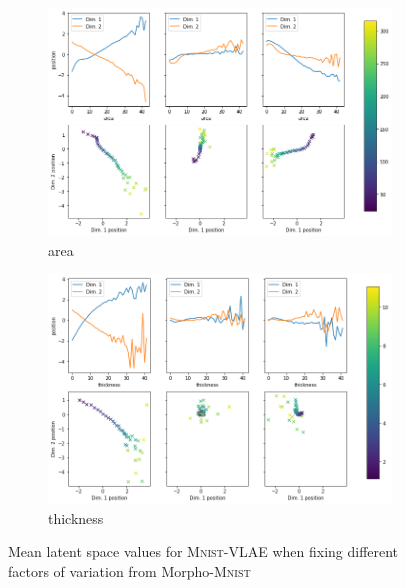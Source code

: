 \documentclass{beamer}
\begin{document}
\begin{frame}
\begin{figure}
\centering
\begin{subfigure}{.48\textwidth}
\includegraphics[width=\textwidth]{images/latent_space_traversals/vlae_mnist_morpho_latent_space_values_area.png}
\caption{area}
\end{subfigure}
\hfill
\begin{subfigure}{.48\textwidth}
\includegraphics[width=\textwidth]{images/latent_space_traversals/vlae_mnist_morpho_latent_space_values_thickness.png}
\caption{thickness}
\end{subfigure}
\caption{Mean latent space values for \textsc{Mnist}-VLAE when fixing different factors of variation from Morpho-\textsc{Mnist}}
\end{figure}
\end{frame}
\end{document}
